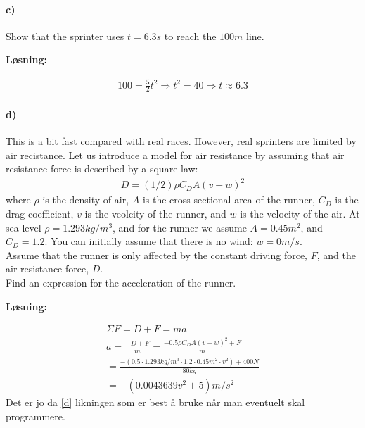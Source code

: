 \documentclass[11pt, A4paper,norsk]{article}
\begin{document}
		\paragraph{c)}
			\begin{flushleft}
Show that the sprinter uses $t = 6.3s$ to reach the $100m$ line.
			\end{flushleft}
			\begin{flushleft}
\textbf{Løsning:}
			\end{flushleft}
			\begin{flushleft}
				\begin{align}
100 = \frac{5}{2}t^{2} \Rightarrow t^{2} = 40 \Rightarrow t \approx 6.3
				\end{align}
			\end{flushleft}
		\paragraph{d)}
			\begin{flushleft}
This is a bit fast compared with real races. However, real sprinters are limited by  air recistance. Let us introduce a model for air resistance by assuming that air resistance force is described by a square law:
				\begin{align}
					D = (1/2) \rho C_{D }A (v - w)^{2}
				\end{align}
where $\rho$ is the density of air, $A$ is the cross-sectional area of the runner, $C_{D}$ is the drag coefficient, $v$ is the veolcity of the runner, and $w$ is the velocity of the air. At sea level $\rho = 1.293kg/m^{3}$, and for the runner we assume $A = 0.45m^{2}$, and $C_{D} = 1.2$. You can initially assume that there is no wind: $w = 0m/s$. \\
Assume that the runner is only affected by the constant driving force, $F$, and the air resistance force, $D$. \\
\vspace{2mm} Find an expression for the acceleration of the runner.
			\end{flushleft}
			\begin{flushleft}
\textbf{Løsning:}
			\end{flushleft}
			\begin{flushleft}
				\begin{align}
\Sigma F = D + F = ma \\
a = \frac{-D + F}{m} = \frac{-0.5\rho C_{D}A(v - w)^{2} + F}{m} \label{d} \\
  = \frac{-(0.5 \cdot 1.293kg/m^{3} \cdot 1.2 \cdot 0.45m^{2} \cdot v^{2}) + 400N}{80kg} \\
= -(0.0043639v^{2} + 5)m/s^{2}
				\end{align}
Det er jo da \ref{d} likningen som er best å bruke når man eventuelt skal programmere.
			\end{flushleft}
\end{document}

